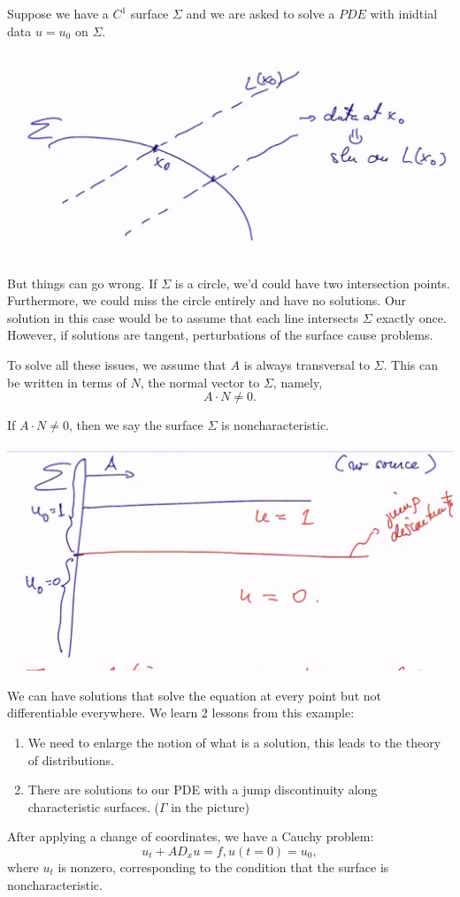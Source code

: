 \documentclass[11pt]{scrartcl}
\begin{document}
Suppose we have a $C^1$ surface $\Sigma$ and we are asked to solve a $PDE$ with inidtial data $u = u_0$
 on $\Sigma$.  
 \begin{center}
\includegraphics[scale=0.5]{sigma.png}
\end{center}
But things can go wrong.  If $\Sigma$ is a circle, we'd could have two intersection points.  Furthermore, we could miss the circle entirely and have no solutions.   Our solution in this case would be to assume that each line intersects $\Sigma$ exactly once.  However, if solutions are tangent, perturbations of the surface cause problems.  

To solve all these issues, we assume that $A$ is always transversal to $\Sigma$.  This can be written in terms of $N$, the normal vector to $\Sigma$, namely,
$$A \cdot N \ne 0.$$
\begin{definition} If $A \cdot N \ne 0$, then we say the surface $\Sigma$ is noncharacteristic.
\end{definition}
 \begin{center}
\includegraphics[scale=0.5]{bad.png}
\end{center}
We can have solutions that solve the equation at every point but not differentiable everywhere.
We learn 2 lessons from this example:
\begin{enumerate}
\item We need to enlarge the notion of what is a solution, this leads to the theory of distributions.
\item There are solutions to our PDE with a jump discontinuity along characteristic surfaces. ($\Gamma$ in the picture)
\end{enumerate}
After applying a change of coordinates, we have a Cauchy problem:
$$u_t + AD_x u = f, u(t=0) = u_0,$$
where $u_t$ is nonzero, corresponding to the condition that the surface is noncharacteristic.
\pagebreak
\end{document}
